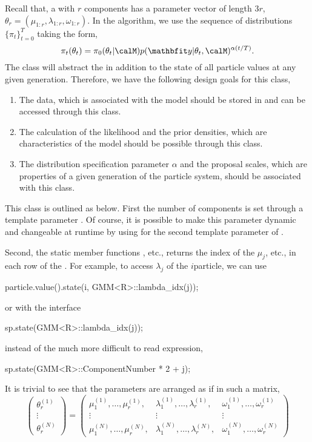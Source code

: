 Recall that, a \gmm with $r$ components has a parameter vector of length $3r$, $\theta_r = (\mu_{1:r}, \lambda_{1:r}, \omega_{1:r})$. In the \smc[2] algorithm, we use the sequence of distributions $\{\pi_t\}_{t=0}^T$ taking the form,
\begin{equation*}
  \pi_t(\theta_t) =
  \pi_0(\theta_t|\calM) p(\data|\theta_t,\calM)^{\alpha(t/T)}.
\end{equation*}
The  class will abstract the \gmm in addition to the state of all particle values at any given generation. Therefore, we have the following design goals for this class,
\begin{enumerate}
  \item The data, which is associated with the model should be stored in and can be accessed through this class.
  \item The calculation of the likelihood and the prior densities, which are characteristics of the model should be possible through this class.
  \item The distribution specification parameter $\alpha$ and the \mcmc proposal scales, which are properties of a given generation of the particle system, should be associated with this class.
\end{enumerate}
This class is outlined as below.
First the number of components is set through a template parameter . Of course, it is possible to make this parameter dynamic and changeable at runtime by using  for the second template parameter of .

Second, the static member functions , etc., returns the index of the $\mu_j$, etc., in each row of the . For example, to access $\lambda_j$ of the $i$\xth particle, we can use
\begin{cppcode}
particle.value().state(i, GMM<R>::lambda_idx(j));
\end{cppcode}
or with the  interface
\begin{cppcode}
sp.state(GMM<R>::lambda_idx(j));
\end{cppcode}
instead of the much more difficult to read expression,
\begin{cppcode}
sp.state(GMM<R>::ComponentNumber * 2 + j);
\end{cppcode}
It is trivial to see that the parameters are arranged as if in such a matrix,
\begin{equation*}
  \begin{pmatrix}
    \theta_r^{(1)} \\ \vdots \\ \theta_r^{(N)}
  \end{pmatrix} =
  \begin{pmatrix}
    \mu_1^{(1)},\dots,\mu_r^{(1)}, &
    \lambda_1^{(1)},\dots,\lambda_r^{(1)}, &
    \omega_1^{(1)},\dots,\omega_r^{(1)} \\
    \vdots & \vdots & \vdots \\
    \mu_1^{(N)},\dots,\mu_r^{(N)}, &
    \lambda_1^{(N)},\dots,\lambda_r^{(N)}, &
    \omega_1^{(N)},\dots,\omega_r^{(N)}
  \end{pmatrix}
\end{equation*}

